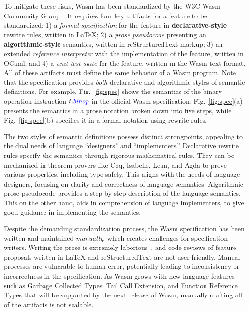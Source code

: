 To mitigate these risks, Wasm has been standardized by
the W3C Wasm Community Group~\cite{wasm-w3c}.
It requires four key artifacts for a feature to be standardized:
1) a \textit{formal specification} for the feature in \textbf{declarative-style} rewrite rules, written in LaTeX;
2) a \textit{prose pseudocode} presenting an \textbf{algorithmic-style} semantics, written in reStructuredText markup;
3) an extended \textit{reference interpreter} with the implementation of the feature, written in OCaml; and
4) a \textit{unit test suite} for the feature, written in the Wasm text format.
All of these artifacts must define the same behavior of a Wasm program.
Note that the specification provides \textit{both} declarative and algorithmic styles of semantic definitions.
For example, Fig.~\ref{fig:spec} shows the semantics of the binary operation instruction
$t.\mathit{{\color{blue}{binop}}}$ in the official Wasm specification.
Fig.~\ref{fig:spec}(a) presents the semantics in a prose notation broken down into five steps,
while Fig.~\ref{fig:spec}(b) specifies it in a formal notation using rewrite rules.

The two styles of semantic definitions possess distinct strongpoints,
appealing to the dual needs of language ``designers'' and ``implementers.''
Declarative rewrite rules specify the semantics through rigorous mathematical rules.
They can be mechanized in theorem provers like Coq, Isabelle, Lean, and Agda
to prove various properties, including type safety.
This aligns with the needs of language designers,
focusing on clarity and correctness of language semantics.
Algorithmic prose pseudocode provides a step-by-step description of the language semantics.
This on the other hand, aids in comprehension of language implementers,
to give good guidance in implementing the semantics.

Despite the demanding standardization process, the Wasm specification has been
written and maintained \textit{manually}, which creates challenges for specification writers.
Writing the prose is extremely laborious~\cite{Andreasicfp23}, and code reviews of
feature proposals written in LaTeX and reStructuredText are not user-friendly.
Manual processes are vulnerable to human error, potentially leading
to inconsistency or incorrectness in the specification.
As Wasm grows with new language features such as Garbage Collected Types,
Tail Call Extension, and Function Reference Types that will be supported by
the next release of Wasm, manually crafting all of the artifacts is not scalable.

